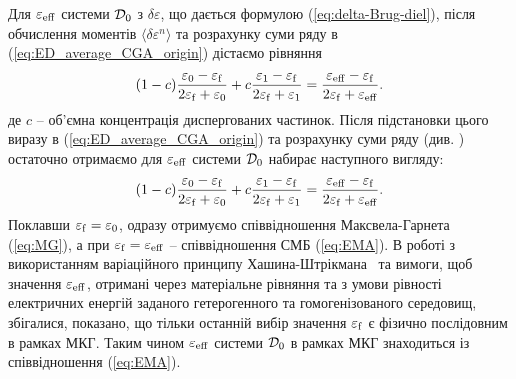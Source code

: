 \documentclass[14pt,twoside]{vakthesis}
\begin{document}
Для $\varepsilon_{\rm eff}$ системи ${\cal D}_0$ з $\delta\varepsilon$, що дається формулою (\ref{eq:delta-Brug-diel}), після обчислення моментів $\langle \delta\varepsilon^n \rangle$ та розрахунку суми ряду  в (\ref{eq:ED_average_CGA_origin}) дістаємо рівняння 
\begin{equation}\label{eq:general-diel-CGA}
(1 - c) \frac{{\varepsilon}_0 - {\varepsilon}_{\rm f}}{2{\varepsilon}_{\rm f} + {\varepsilon}_0} + 
c \frac{{\varepsilon}_1 - {\varepsilon}_{\rm f}}{2{\varepsilon}_{\rm f} + {\varepsilon}_1} = \frac{\varepsilon_{\rm eff} - \varepsilon_{\rm f}}{2\varepsilon_{\rm f} + \varepsilon_{\rm eff}}.
\end{equation}
де $c$  -- об'ємна концентрація диспергованих частинок.
Після підстановки цього виразу в (\ref{eq:ED_average_CGA_origin}) та розрахунку суми ряду (див. \cite{Sushko2007, Sushko2017}) остаточно отримаємо для $\varepsilon_{\rm eff}$ системи ${\cal D}_0$ набирає наступного вигляду:
\begin{equation}\label{eq:general-diel-CGA}
(1 - c) \frac{{\varepsilon}_0 - {\varepsilon}_{\rm f}}{2{\varepsilon}_{\rm f} + {\varepsilon}_0} + 
c \frac{{\varepsilon}_1 - {\varepsilon}_{\rm f}}{2{\varepsilon}_{\rm f} + {\varepsilon}_1} = \frac{\varepsilon_{\rm eff} - \varepsilon_{\rm f}}{2\varepsilon_{\rm f} + \varepsilon_{\rm eff}}.
\end{equation}
Поклавши $\varepsilon_{\rm f} = \varepsilon_{0}$, одразу отримуємо співвідношення Максвела-Гарнета (\ref{eq:MG}), а при $\varepsilon_{\rm f} = \varepsilon_{\rm eff}$ -- співвідношення СМБ (\ref{eq:EMA}). В роботі \cite{Sushko2017} з використанням варіаційного принципу Хашина-Штрікмана~\cite{HS1962} та вимоги, щоб значення $\varepsilon_{\rm eff}$, отримані через матеріальне рівняння та з умови рівності електричних енергій заданого гетерогенного та гомогенізованого середовищ, збігалися, показано, що тільки останній вибір значення $\varepsilon_{\rm f}$ є фізично послідовним в рамках МКГ. Таким чином ${\varepsilon}_{\rm eff}$ системи ${\cal D}_0$ в рамках МКГ знаходиться із співвідношення (\ref{eq:EMA}).
\end{document}
